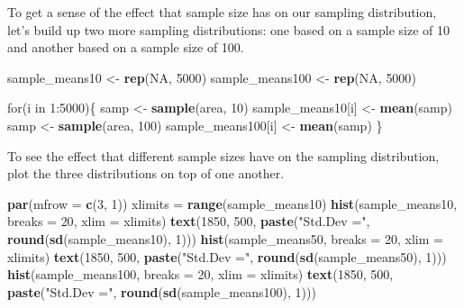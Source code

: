 \documentclass[]{article}
\newenvironment{Shaded}{\begin{snugshade}}{\end{snugshade}}
\newcommand{\KeywordTok}[1]{\textcolor[rgb]{0.13,0.29,0.53}{\textbf{{#1}}}}
\newcommand{\DataTypeTok}[1]{\textcolor[rgb]{0.13,0.29,0.53}{{#1}}}
\newcommand{\DecValTok}[1]{\textcolor[rgb]{0.00,0.00,0.81}{{#1}}}
\newcommand{\StringTok}[1]{\textcolor[rgb]{0.31,0.60,0.02}{{#1}}}
\newcommand{\OtherTok}[1]{\textcolor[rgb]{0.56,0.35,0.01}{{#1}}}
\newcommand{\NormalTok}[1]{{#1}}
\begin{document}
To get a sense of the effect that sample size has on our sampling
distribution, let's build up two more sampling distributions: one based
on a sample size of 10 and another based on a sample size of 100.

\begin{Shaded}
\begin{Highlighting}[]
\NormalTok{sample_means10 <-}\StringTok{ }\KeywordTok{rep}\NormalTok{(}\OtherTok{NA}\NormalTok{, }\DecValTok{5000}\NormalTok{)}
\NormalTok{sample_means100 <-}\StringTok{ }\KeywordTok{rep}\NormalTok{(}\OtherTok{NA}\NormalTok{, }\DecValTok{5000}\NormalTok{)}

\NormalTok{for(i in }\DecValTok{1}\NormalTok{:}\DecValTok{5000}\NormalTok{)\{}
  \NormalTok{samp <-}\StringTok{ }\KeywordTok{sample}\NormalTok{(area, }\DecValTok{10}\NormalTok{)}
  \NormalTok{sample_means10[i] <-}\StringTok{ }\KeywordTok{mean}\NormalTok{(samp)}
  \NormalTok{samp <-}\StringTok{ }\KeywordTok{sample}\NormalTok{(area, }\DecValTok{100}\NormalTok{)}
  \NormalTok{sample_means100[i] <-}\StringTok{ }\KeywordTok{mean}\NormalTok{(samp)}
\NormalTok{\}}
\end{Highlighting}
\end{Shaded}

To see the effect that different sample sizes have on the sampling
distribution, plot the three distributions on top of one another.

\begin{Shaded}
\begin{Highlighting}[]
\KeywordTok{par}\NormalTok{(}\DataTypeTok{mfrow =} \KeywordTok{c}\NormalTok{(}\DecValTok{3}\NormalTok{, }\DecValTok{1}\NormalTok{))}
\NormalTok{xlimits =}\StringTok{ }\KeywordTok{range}\NormalTok{(sample_means10)}
\KeywordTok{hist}\NormalTok{(sample_means10, }\DataTypeTok{breaks =} \DecValTok{20}\NormalTok{, }\DataTypeTok{xlim =} \NormalTok{xlimits)}
\KeywordTok{text}\NormalTok{(}\DecValTok{1850}\NormalTok{, }\DecValTok{500}\NormalTok{, }\KeywordTok{paste}\NormalTok{(}\StringTok{"Std.Dev ="}\NormalTok{, }\KeywordTok{round}\NormalTok{(}\KeywordTok{sd}\NormalTok{(sample_means10), }\DecValTok{1}\NormalTok{)))}
\KeywordTok{hist}\NormalTok{(sample_means50, }\DataTypeTok{breaks =} \DecValTok{20}\NormalTok{, }\DataTypeTok{xlim =} \NormalTok{xlimits)}
\KeywordTok{text}\NormalTok{(}\DecValTok{1850}\NormalTok{, }\DecValTok{500}\NormalTok{, }\KeywordTok{paste}\NormalTok{(}\StringTok{"Std.Dev ="}\NormalTok{, }\KeywordTok{round}\NormalTok{(}\KeywordTok{sd}\NormalTok{(sample_means50), }\DecValTok{1}\NormalTok{)))}
\KeywordTok{hist}\NormalTok{(sample_means100, }\DataTypeTok{breaks =} \DecValTok{20}\NormalTok{, }\DataTypeTok{xlim =} \NormalTok{xlimits)}
\KeywordTok{text}\NormalTok{(}\DecValTok{1850}\NormalTok{, }\DecValTok{500}\NormalTok{, }\KeywordTok{paste}\NormalTok{(}\StringTok{"Std.Dev ="}\NormalTok{, }\KeywordTok{round}\NormalTok{(}\KeywordTok{sd}\NormalTok{(sample_means100), }\DecValTok{1}\NormalTok{)))}
\end{Highlighting}
\end{Shaded}
\end{document}
